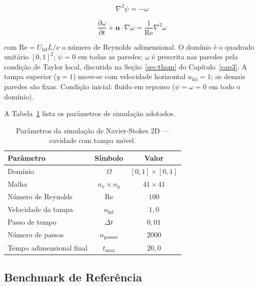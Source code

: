 \begin{equation}
    \nabla^2 \psi = -\omega
    \label{eq:val_ns_poisson}
\end{equation}

\begin{equation}
    \frac{\partial \omega}{\partial t} + \mathbf{u} \cdot \nabla \omega = \frac{1}{\mathrm{Re}} \nabla^2 \omega
    \label{eq:val_ns_transporte}
\end{equation}

\noindent com $\mathrm{Re} = U_{\mathrm{lid}} L / \nu$ o número de Reynolds adimensional. O domínio é o quadrado unitário $[0, 1]^2$; $\psi = 0$ em todas as paredes; $\omega$ é prescrita nas paredes pela condição de Taylor local, discutida na Seção~\ref{sec:thom} do Capítulo~\ref{cap3}. A tampa superior ($y = 1$) move-se com velocidade horizontal $u_{\mathrm{lid}} = 1$; as demais paredes são fixas. Condição inicial: fluido em repouso ($\psi = \omega = 0$ em todo o domínio).

A Tabela~\ref{tab:val_ns_params} lista os parâmetros de simulação adotados.

\begin{table}[htbp]
    \centering
    \caption{Parâmetros da simulação de Navier-Stokes 2D --- cavidade com tampa móvel.}
    \label{tab:val_ns_params}
    \begin{tabular}{lcc}
        \hline
        \textbf{Parâmetro} & \textbf{Símbolo} & \textbf{Valor} \\
        \hline
        Domínio                         & $\Omega$      & $[0, 1] \times [0, 1]$ \\
        Malha                           & $n_x \times n_y$ & $41 \times 41$     \\
        Número de Reynolds              & $\mathrm{Re}$ & $100$                  \\
        Velocidade da tampa             & $u_{\mathrm{lid}}$ & $1{,}0$           \\
        Passo de tempo                  & $\Delta t$    & $0{,}01$               \\
        Número de passos                & $n_{\mathrm{passos}}$ & $2000$         \\
        Tempo adimensional final        & $t_{\max}$    & $20{,}0$               \\
        \hline
    \end{tabular}
\end{table}

\subsection{Benchmark de Referência}

